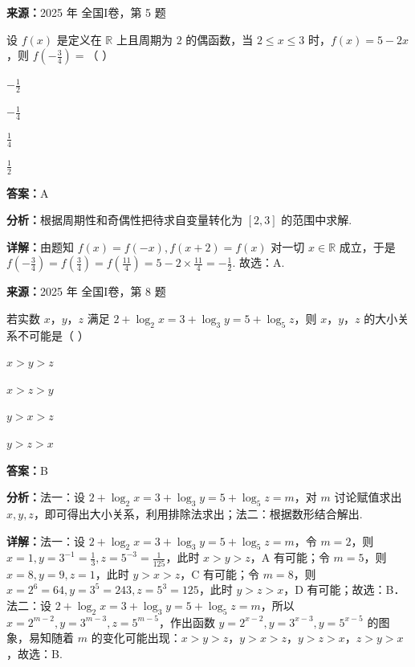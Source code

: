 \begin{question}[points=5]
\textbf{来源：}2025 年 全国I卷，第 5 题\par
设 $f(x)$ 是定义在 $\mathbb{R}$ 上且周期为 $2$ 的偶函数，当 $2 \le x \le 3$ 时，$f(x)=5-2x$，则 $f\left(-\frac{3}{4}\right)=$（ ）
\begin{choices}
  \item $-\frac{1}{2}$
  \item $-\frac{1}{4}$
  \item $\frac{1}{4}$
  \item $\frac{1}{2}$
\end{choices}
\begin{solution}
\textbf{答案：}A

\textbf{分析：}根据周期性和奇偶性把待求自变量转化为 $[2,3]$ 的范围中求解.

\textbf{详解：}由题知 $f(x)=f(-x), f(x+2)=f(x)$ 对一切 $x \in \mathbb{R}$ 成立，于是 $f\left(-\frac{3}{4}\right) = f\left(\frac{3}{4}\right) = f\left(\frac{11}{4}\right) = 5 - 2\times\frac{11}{4} = -\frac{1}{2}$. 故选：A.
\end{solution}
\end{question}

\begin{question}[points=5]
\textbf{来源：}2025 年 全国I卷，第 8 题\par
若实数 $x$，$y$，$z$ 满足 $2 + \log_2 x = 3 + \log_3 y = 5 + \log_5 z$，则 $x$，$y$，$z$ 的大小关系不可能是（ ）
\begin{choices}
  \item $x > y > z$
  \item $x > z > y$
  \item $y > x > z$
  \item $y > z > x$
\end{choices}
\begin{solution}
\textbf{答案：}B

\textbf{分析：}法一：设 $2+\log_2 x = 3+\log_3 y = 5+\log_5 z = m$，对 $m$ 讨论赋值求出 $x,y,z$，即可得出大小关系，利用排除法求出；法二：根据数形结合解出.

\textbf{详解：}法一：设 $2+\log_2 x = 3+\log_3 y = 5+\log_5 z = m$，令 $m=2$，则 $x=1,y=3^{-1}=\frac{1}{3},z=5^{-3}=\frac{1}{125}$，此时 $x>y>z$，A 有可能；令 $m=5$，则 $x=8,y=9,z=1$，此时 $y>x>z$，C 有可能；令 $m=8$，则 $x=2^6=64,y=3^5=243,z=5^3=125$，此时 $y>z>x$，D 有可能；故选：B．法二：设 $2+\log_2 x = 3+\log_3 y = 5+\log_5 z = m$，所以 $x=2^{m-2}, y=3^{m-3}, z=5^{m-5}$，作出函数 $y=2^{x-2}, y=3^{x-3}, y=5^{x-5}$ 的图象，易知随着 $m$ 的变化可能出现：$x>y>z$，$y>x>z$，$y>z>x$，$z>y>x$，故选：B.
\end{solution}
\end{question}

